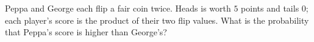 Peppa and George each flip a fair coin twice. Heads is worth $5$ points and tails $0$; each player's score is the product of their two flip values. What is the probability that Peppa's score is higher than George's?
